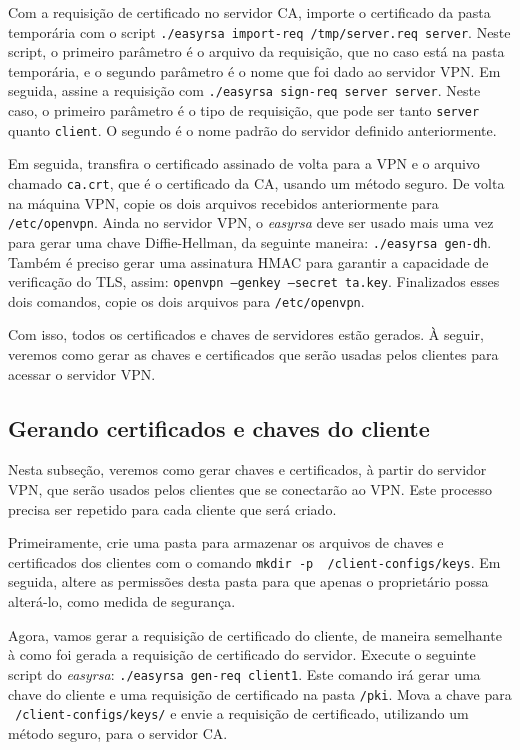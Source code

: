 \documentclass[12pt]{article}
\begin{document}
\begin{flushleft}
Com a requisição de certificado no servidor CA, importe o certificado da pasta temporária com o script 
\texttt{./easyrsa import-req /tmp/server.req server}. Neste script, o primeiro parâmetro é o arquivo da requisição,
que no caso está na pasta temporária, e o segundo parâmetro é o nome que foi dado ao servidor VPN. Em seguida,
assine a requisição com \texttt{./easyrsa sign-req server server}. Neste caso, o primeiro parâmetro é o tipo de 
requisição, que pode ser tanto \texttt{server} quanto \texttt{client}. O segundo é o nome padrão do servidor definido anteriormente.

Em seguida, transfira o certificado assinado de volta para a VPN e o arquivo chamado
\texttt{ca.crt}, que é o certificado da CA, usando um método seguro. De volta na máquina VPN, copie os dois arquivos recebidos 
anteriormente para \texttt{/etc/openvpn}. Ainda no servidor VPN, o \emph{easyrsa} deve ser usado mais uma vez para
gerar uma chave Diffie-Hellman, da seguinte maneira: \texttt{./easyrsa gen-dh}. Também é preciso gerar uma
assinatura HMAC para garantir a capacidade de verificação do TLS, assim: \texttt{openvpn --genkey --secret ta.key}.
Finalizados esses dois comandos, copie os dois arquivos para \texttt{/etc/openvpn}. 

Com isso, todos os certificados e chaves de servidores estão gerados. À seguir, veremos como gerar as chaves 
e certificados que serão usadas pelos clientes para acessar o servidor VPN.


\subsection{Gerando certificados e chaves do cliente}

Nesta subseção, veremos como gerar chaves e certificados, à partir do servidor VPN, que serão usados
pelos clientes que se conectarão ao VPN. Este processo precisa ser repetido para cada cliente que será criado.

Primeiramente, crie uma pasta para armazenar os arquivos de chaves e certificados dos clientes com o 
comando \texttt{mkdir -p ~/client-configs/keys}. Em seguida, altere as permissões desta pasta para que apenas o proprietário
possa alterá-lo, como medida de segurança. 

Agora, vamos gerar a requisição de certificado do cliente, de maneira semelhante à como foi gerada a requisição de certificado
do servidor. Execute o seguinte script do \emph{easyrsa}: \texttt{./easyrsa gen-req client1}. Este comando irá gerar 
uma chave do cliente e uma requisição de certificado na pasta \texttt{/pki}. Mova a chave para \texttt{~/client-configs/keys/}
e envie a requisição de certificado, utilizando um método seguro, para o servidor CA. 


\end{flushleft}
\end{document}
